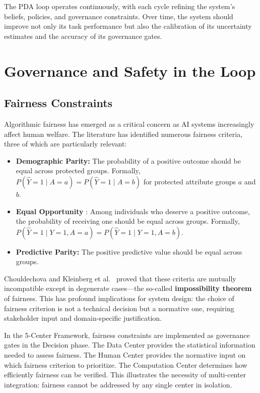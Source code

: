 \documentclass[11pt,a4paper]{article}
\begin{document}
The PDA loop operates continuously, with each cycle refining the system's beliefs, policies, and governance constraints. Over time, the system should improve not only its task performance but also the calibration of its uncertainty estimates and the accuracy of its governance gates.

\section{Governance and Safety in the Loop}
\label{sec:governance}

\subsection{Fairness Constraints}

Algorithmic fairness has emerged as a critical concern as AI systems increasingly affect human welfare. The literature has identified numerous fairness criteria, three of which are particularly relevant:

\begin{itemize}[leftmargin=*, itemsep=2pt]
  \item \textbf{Demographic Parity:} The probability of a positive outcome should be equal across protected groups. Formally, $P(\hat{Y} = 1 \mid A = a) = P(\hat{Y} = 1 \mid A = b)$ for protected attribute groups $a$ and $b$.
  \item \textbf{Equal Opportunity} \citep{hardt2016equality}: Among individuals who deserve a positive outcome, the probability of receiving one should be equal across groups. Formally, $P(\hat{Y} = 1 \mid Y = 1, A = a) = P(\hat{Y} = 1 \mid Y = 1, A = b)$.
  \item \textbf{Predictive Parity:} The positive predictive value should be equal across groups.
\end{itemize}

Chouldechova \citep{chouldechova2017fair} and Kleinberg et al.\ \citep{kleinberg2016inherent} proved that these criteria are mutually incompatible except in degenerate cases---the so-called \textbf{impossibility theorem} of fairness. This has profound implications for system design: the choice of fairness criterion is not a technical decision but a normative one, requiring stakeholder input and domain-specific justification.

In the 5-Center Framework, fairness constraints are implemented as governance gates in the Decision phase. The Data Center provides the statistical information needed to assess fairness. The Human Center provides the normative input on which fairness criterion to prioritize. The Computation Center determines how efficiently fairness can be verified. This illustrates the necessity of multi-center integration: fairness cannot be addressed by any single center in isolation.
\end{document}
